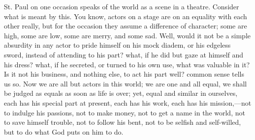 St. Paul on one occasion speaks of the world as a scene in a
theatre. Consider what is meant by this. You know, actors on a stage
are on an equality with each other really, but for the occasion they
assume a difference of character; some are high, some are low, some
are merry, and some sad. Well, would it not be a simple absurdity in
any actor to pride himself on his mock diadem, or his edgeless sword,
instead of attending to his part? what, if he did but gaze at himself
and his dress? what, if he secreted, or turned to his own use, what
was valuable in it? Is it not his business, and nothing else, to act
his part well? common sense tells us so. Now we are all but actors in
this world; we are one and all equal, we shall be judged as equals as
soon as life is over; yet, equal and similar in ourselves, each has
his special part at present, each has his work, each has his mission,—not
to indulge his passions, not to make money, not to get a name in the
world, not to save himself trouble, not to follow his bent, not to be
selfish and self-willed, but to do what God puts on him to do.

